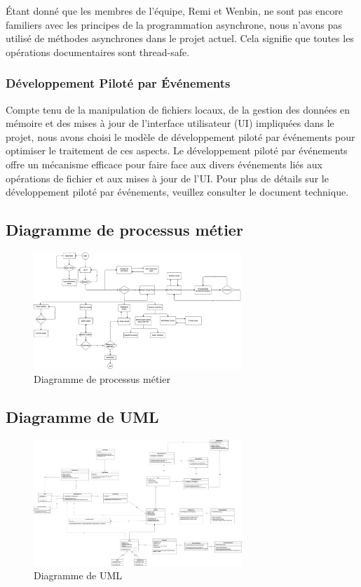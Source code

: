 \documentclass{article}
\begin{document}
Étant donné que les membres de l'équipe, Remi et Wenbin, ne sont pas encore familiers avec les principes de la programmation asynchrone, nous n'avons pas utilisé de méthodes asynchrones dans le projet actuel. Cela signifie que toutes les opérations documentaires sont thread-safe.
\subsubsection{Développement Piloté par Événements}
Compte tenu de la manipulation de fichiers locaux, de la gestion des données en mémoire et des mises à jour de l'interface utilisateur (UI) impliquées dans le projet, nous avons choisi le modèle de développement piloté par événements pour optimiser le traitement de ces aspects. Le développement piloté par événements offre un mécanisme efficace pour faire face aux divers événements liés aux opérations de fichier et aux mises à jour de l'UI. Pour plus de détails sur le développement piloté par événements, veuillez consulter le document technique.
\subsection{Diagramme de processus métier}
\begin{figure}[H]
    \centering
    \includegraphics[width=0.7\textwidth]{../analysises/bussness process/V1.0/analysisV1.0.png}
    \caption{Diagramme de processus métier}
    \label{fig:processusMetier}
\end{figure}
\subsection{Diagramme de UML}
\begin{figure}[H]
    \centering
    \includegraphics[width=0.7\textwidth]{../analysises/UML/V1.0/UMLV1.4.png}
    \caption{Diagramme de UML}
    \label{fig:UML}
\end{figure}
\end{document}
